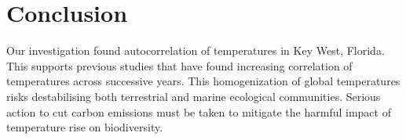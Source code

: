 \documentclass[12pt]{article}
\begin{document}
\section{Conclusion}
Our investigation found autocorrelation of temperatures in Key West, Florida. This supports previous studies that have found increasing correlation of temperatures across successive years. This homogenization of global temperatures risks destabilising both terrestrial and marine ecological communities. Serious action to cut carbon emissions must be taken to mitigate the harmful impact of temperature rise on biodiversity.



\end{document}
